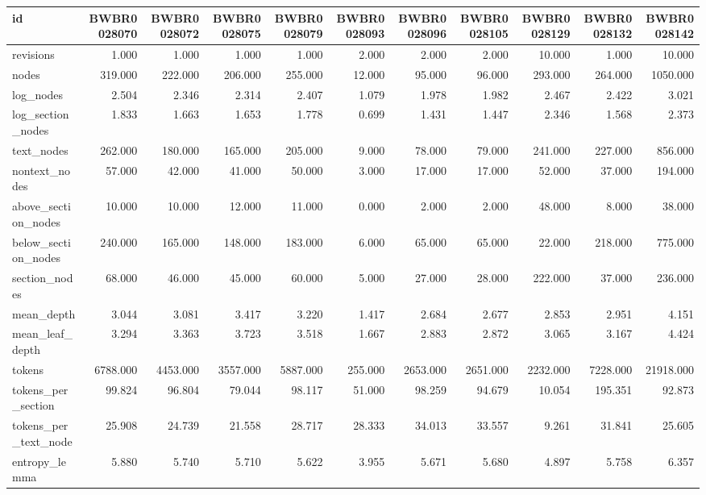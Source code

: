 \begin{tabular}{lrrrrrrrrrr}
\toprule
id & BWBR0028070 & BWBR0028072 & BWBR0028075 & BWBR0028079 & BWBR0028093 & BWBR0028096 & BWBR0028105 & BWBR0028129 & BWBR0028132 & BWBR0028142 \\
\midrule
revisions & 1.000 & 1.000 & 1.000 & 1.000 & 2.000 & 2.000 & 2.000 & 10.000 & 1.000 & 10.000 \\
\cline{1-11}
nodes & 319.000 & 222.000 & 206.000 & 255.000 & 12.000 & 95.000 & 96.000 & 293.000 & 264.000 & 1050.000 \\
\cline{1-11}
log\_nodes & 2.504 & 2.346 & 2.314 & 2.407 & 1.079 & 1.978 & 1.982 & 2.467 & 2.422 & 3.021 \\
\cline{1-11}
log\_section\_nodes & 1.833 & 1.663 & 1.653 & 1.778 & 0.699 & 1.431 & 1.447 & 2.346 & 1.568 & 2.373 \\
\cline{1-11}
text\_nodes & 262.000 & 180.000 & 165.000 & 205.000 & 9.000 & 78.000 & 79.000 & 241.000 & 227.000 & 856.000 \\
\cline{1-11}
nontext\_nodes & 57.000 & 42.000 & 41.000 & 50.000 & 3.000 & 17.000 & 17.000 & 52.000 & 37.000 & 194.000 \\
\cline{1-11}
above\_section\_nodes & 10.000 & 10.000 & 12.000 & 11.000 & 0.000 & 2.000 & 2.000 & 48.000 & 8.000 & 38.000 \\
\cline{1-11}
below\_section\_nodes & 240.000 & 165.000 & 148.000 & 183.000 & 6.000 & 65.000 & 65.000 & 22.000 & 218.000 & 775.000 \\
\cline{1-11}
section\_nodes & 68.000 & 46.000 & 45.000 & 60.000 & 5.000 & 27.000 & 28.000 & 222.000 & 37.000 & 236.000 \\
\cline{1-11}
mean\_depth & 3.044 & 3.081 & 3.417 & 3.220 & 1.417 & 2.684 & 2.677 & 2.853 & 2.951 & 4.151 \\
\cline{1-11}
mean\_leaf\_depth & 3.294 & 3.363 & 3.723 & 3.518 & 1.667 & 2.883 & 2.872 & 3.065 & 3.167 & 4.424 \\
\cline{1-11}
tokens & 6788.000 & 4453.000 & 3557.000 & 5887.000 & 255.000 & 2653.000 & 2651.000 & 2232.000 & 7228.000 & 21918.000 \\
\cline{1-11}
tokens\_per\_section & 99.824 & 96.804 & 79.044 & 98.117 & 51.000 & 98.259 & 94.679 & 10.054 & 195.351 & 92.873 \\
\cline{1-11}
tokens\_per\_text\_node & 25.908 & 24.739 & 21.558 & 28.717 & 28.333 & 34.013 & 33.557 & 9.261 & 31.841 & 25.605 \\
\cline{1-11}
entropy\_lemma & 5.880 & 5.740 & 5.710 & 5.622 & 3.955 & 5.671 & 5.680 & 4.897 & 5.758 & 6.357 \\

\end{tabular}
